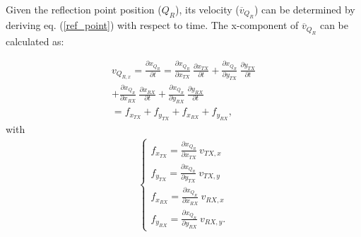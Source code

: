 	Given the reflection point position ($Q_R$), its velocity ($\overline{v}_{Q_{R}}$) can be determined by deriving eq. (\ref{ref_point}) with respect to time. The x-component of $\overline{v}_{Q_{R}}$ can be calculated as: 
	
	\begin{equation}
	\begin{gathered}
	v_{Q_{R,x}} = \frac{\partial x_{Q_R}}{\partial t} = \frac{\partial x_{Q_R}}{\partial x_{TX}}~\frac{\partial x_{TX}}{\partial t} + \frac{\partial x_{Q_R}}{\partial y_{TX}}~\frac{\partial y_{TX}}{\partial t} \\ 
	+ \frac{\partial x_{Q_R}}{\partial x_{RX}}~\frac{\partial x_{RX}}{\partial t} + \frac{\partial x_{Q_R}}{\partial y_{RX}}~\frac{\partial y_{RX}}{\partial t}  \\ 
	= f_{x_{TX}} + f_{y_{TX}} + f_{x_{RX}} + f_{y_{RX}}, 
	\end{gathered}
	\label{vQRx}
	\end{equation}
	with 
	\begin{equation*}
	\begin{gathered}
	    \begin{cases*}
	        f_{x_{TX}} = \frac{\partial x_{Q_R}}{\partial x_{TX}}~v_{TX,x} \\
	        f_{y_{TX}} = \frac{\partial x_{Q_R}}{\partial y_{TX}}~v_{TX,y} \\ 
	        f_{x_{RX}} = \frac{\partial x_{Q_R}}{\partial x_{RX}}~v_{RX,x} \\ 
	        f_{y_{RX}} = \frac{\partial x_{Q_R}}{\partial y_{RX}}~v_{RX,y}.
	    \end{cases*}
	\end{gathered}
   \end{equation*}
	
